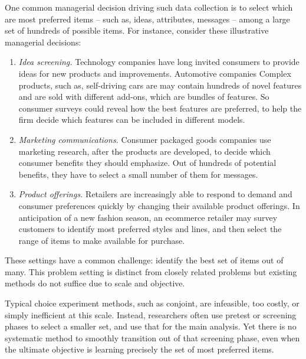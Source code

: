 \documentclass[nonblindrev]{informs3}
\begin{document}
One common managerial decision driving such data collection is to select which are most preferred items -- such as, ideas, attributes, messages -- among a large set of hundreds of possible items. For instance, consider these illustrative managerial decisions: 
\begin{enumerate}
	\item \emph{Idea screening.} Technology companies have long invited consumers to provide ideas for new products and improvements. Automotive companies Complex products, such as, self-driving cars are may contain hundreds of novel features and are sold with different add-ons, which are bundles of features. So consumer surveys could reveal how the best features are preferred, to help the firm decide which features can be included in different models. 
	\item \emph{Marketing communications.} Consumer packaged goods companies use marketing research, after the products are developed, to decide which consumer benefits they should emphasize. Out of hundreds of potential benefits, they have to select a small number of them for messages.
	\item \emph{Product offerings.} Retailers are increasingly able to respond to demand and consumer preferences quickly by changing their available product offerings. In anticipation of a new fashion season, an ecommerce retailer may survey customers to identify most preferred styles and lines, and then select the range of items to make available for purchase. 
\end{enumerate} 





These settings have a common challenge: identify the best set of items out of many.  This problem setting is distinct from closely related problems but existing methods do not suffice due to scale and objective. 

Typical choice experiment methods, such as conjoint, are infeasible, too costly, or simply inefficient at this scale. Instead, researchers often use pretest or screening phases to select a smaller set, and use that for the main analysis. Yet there is no systematic method to smoothly transition out of that screening phase, even when the ultimate objective is learning precisely the set of most preferred items. 
\end{document}
